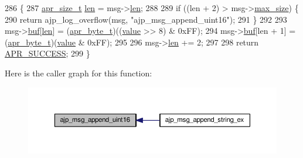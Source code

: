 \begin{DoxyCode}
286 \{
287     \hyperlink{group__apr__platform_gaaa72b2253f6f3032cefea5712a27540e}{apr\_size\_t} \hyperlink{group__APACHE__CORE__LOG_gab5a43233d60ef05c5b5bf5cba3d74468}{len} = msg->\hyperlink{structajp__msg_ab31fbddb808b5f3c0549cdb0f39639cf}{len};
288 
289     \textcolor{keywordflow}{if} ((len + 2) > msg->\hyperlink{structajp__msg_a70f7c841e5b344fc94175a0ebcd7f062}{max\_size}) \{
290         \textcolor{keywordflow}{return} ajp\_log\_overflow(msg, \textcolor{stringliteral}{"ajp\_msg\_append\_uint16"});
291     \}
292 
293     msg->\hyperlink{structajp__msg_a7343b1803e9177dccb3c4716a5e12c3a}{buf}[\hyperlink{group__APACHE__CORE__LOG_gab5a43233d60ef05c5b5bf5cba3d74468}{len}]     = (\hyperlink{group__apr__platform_gadcfa334915b4605a0052cb4ca542eb3a}{apr\_byte\_t})((\hyperlink{group__apr__env_ga711ebc0efad43aba10f32ded4a28cf17}{value} >> 8) & 0xFF);
294     msg->\hyperlink{structajp__msg_a7343b1803e9177dccb3c4716a5e12c3a}{buf}[len + 1] = (\hyperlink{group__apr__platform_gadcfa334915b4605a0052cb4ca542eb3a}{apr\_byte\_t})(\hyperlink{group__apr__env_ga711ebc0efad43aba10f32ded4a28cf17}{value} & 0xFF);
295 
296     msg->\hyperlink{structajp__msg_ab31fbddb808b5f3c0549cdb0f39639cf}{len} += 2;
297 
298     \textcolor{keywordflow}{return} \hyperlink{group__apr__errno_ga9ee311b7bf1c691dc521d721339ee2a6}{APR\_SUCCESS};
299 \}
\end{DoxyCode}


Here is the caller graph for this function\+:
\nopagebreak
\begin{figure}[H]
\begin{center}
\leavevmode
\includegraphics[width=350pt]{group__AJP__api_gad054654d41969f19efc5a6234e661e07_icgraph}
\end{center}
\end{figure}


